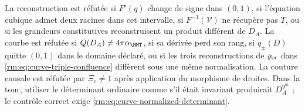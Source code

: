 \begin{falsifierbox}
La reconstruction est réfutée si \(F'(q)\) change de signe dans \((0,1)\), si l’équation cubique admet deux racines dans cet intervalle, si \(F^{-1}(\mathcal V)\) ne récupère pas \(T\), ou si les grandeurs constitutives reconstruisent un produit différent de \(D_A\). La courbe est réfutée si \(Q(D_A)\ne4\pi\alpha_{\HMT}\), si sa dérivée perd son rang, si \(q_\pm(D)\) quitte \((0,1)\) dans le domaine déclaré, ou si les trois reconstructions de \(\varrho_{\rm or}\) dans \cref{rm:eq:curve-triple-confluence} diffèrent sous une même normalisation. La couture causale est réfutée par \(\Xi_c\ne1\) après application du morphisme de droites. Dans la tour, utiliser le déterminant ordinaire comme s’il était invariant produirait \(D_A^{9^m}\) ; le contrôle correct exige \cref{rm:eq:curve-normalized-determinant}.
\end{falsifierbox}
